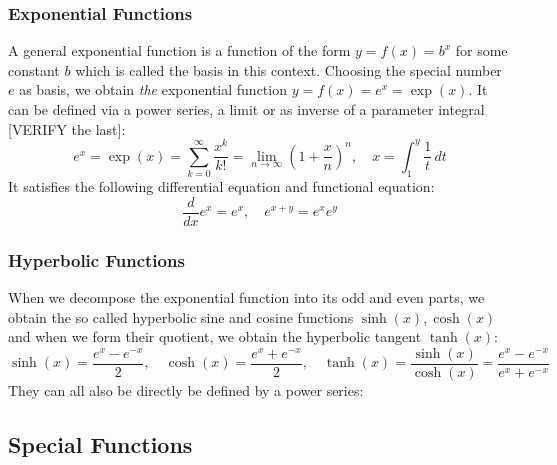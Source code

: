 \subsubsection{Exponential Functions}
A general exponential function is a function of the form $y = f(x) = b^x$ for some constant $b$ which is called the basis in this context. Choosing the special number $e$ as basis, we obtain \emph{the} exponential function $y = f(x) = e^x = \exp(x)$. It can be defined via a power series, a limit or as inverse of a parameter integral [VERIFY the last]:
\begin{equation}
e^x 
= \exp(x)
= \sum_{k=0}^{\infty} \frac{x^k}{k!}
= \lim_{n \rightarrow \infty} \left( 1 + \frac{x}{n} \right)^n, \quad
x = \int_1^y \frac{1}{t} \, dt
\end{equation}
It satisfies the following differential equation and functional equation:
\begin{equation}
\frac{d}{dx} e^x = e^x, \quad
e^{x+y} = e^x e^y
\end{equation}



\subsubsection{Hyperbolic Functions}
When we decompose the exponential function into its odd and even parts, we obtain the so called hyperbolic sine and cosine functions $\sinh(x), \cosh(x)$ and when we form their quotient, we obtain the hyperbolic tangent $\tanh(x)$:
\begin{equation}
 \sinh(x) =	\frac{e^x - e^{-x}}{2}, \quad	
 \cosh(x) =	\frac{e^x + e^{-x}}{2}, \quad
 \tanh(x) =	\frac{\sinh(x)}{\cosh(x)} 
          = \frac{e^x - e^{-x}}{e^x + e^{-x}}
\end{equation}
They can all also be directly be defined by a power series:

\subsection{Special Functions}


